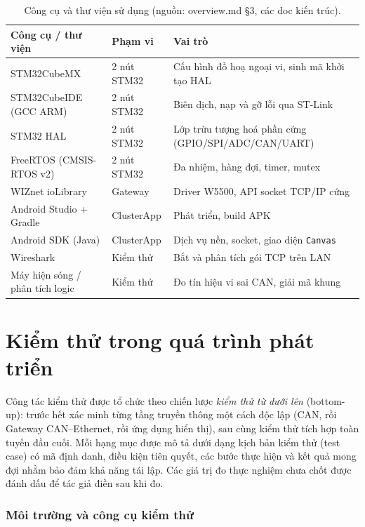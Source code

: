 \documentclass[../DoAn.tex]{subfiles}
\begin{document}
\begin{table}[H]
  \centering
  \caption{Công cụ và thư viện sử dụng (nguồn: overview.md §3, các doc kiến trúc).}
  \label{tab:tools}
  \begin{tabular}{@{}p{3.6cm}p{2.6cm}p{6.0cm}@{}}
    \toprule
    \textbf{Công cụ / thư viện} & \textbf{Phạm vi} & \textbf{Vai trò} \\
    \midrule
    STM32CubeMX & 2 nút STM32 & Cấu hình đồ hoạ ngoại vi, sinh mã khởi tạo HAL \\
    STM32CubeIDE (GCC ARM) & 2 nút STM32 & Biên dịch, nạp và gỡ lỗi qua ST-Link \\
    STM32 HAL & 2 nút STM32 & Lớp trừu tượng hoá phần cứng (GPIO/SPI/ADC/CAN/UART) \\
    FreeRTOS (CMSIS-RTOS v2) & 2 nút STM32 & Đa nhiệm, hàng đợi, timer, mutex \\
    WIZnet ioLibrary & Gateway & Driver W5500, API socket TCP/IP cứng \\
    Android Studio + Gradle & ClusterApp & Phát triển, build APK \\
    Android SDK (Java) & ClusterApp & Dịch vụ nền, socket, giao diện \texttt{Canvas} \\
    Wireshark & Kiểm thử & Bắt và phân tích gói TCP trên LAN \\
    Máy hiện sóng / phân tích logic & Kiểm thử & Đo tín hiệu vi sai CAN, giải mã khung \\
    \bottomrule
  \end{tabular}
\end{table}

\section{Kiểm thử trong quá trình phát triển}
\label{section:4.4}

Công tác kiểm thử được tổ chức theo chiến lược \textit{kiểm thử từ dưới lên}
(bottom-up): trước hết xác minh từng tầng truyền thông một cách độc lập (CAN,
rồi Gateway CAN--Ethernet, rồi ứng dụng hiển thị), sau cùng kiểm thử tích hợp
toàn tuyến đầu cuối. Mỗi hạng mục được mô tả dưới dạng kịch bản kiểm thử (test
case) có mã định danh, điều kiện tiên quyết, các bước thực hiện và kết quả mong
đợi nhằm bảo đảm khả năng tái lập. Các giá trị đo thực nghiệm chưa chốt được
đánh dấu để tác giả điền sau khi đo.

\subsubsection*{Môi trường và công cụ kiểm thử}
\end{document}
